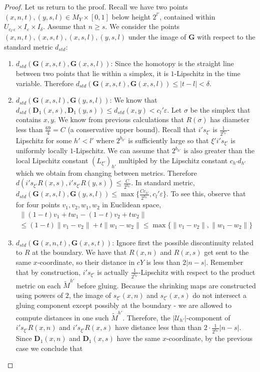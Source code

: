 \documentclass[a4paper,11pt]{article}
\theoremstyle{definition}
\theoremstyle{plain}
\theoremstyle{remark}
\begin{document}
{\begin{proof}
Let us return to the proof. Recall we have two points $(x,n,t),(y,s,l) \in M_{Y} \times [0,1]$ below height $2^{l'}$, contained within $U_{c_{l'}\varepsilon} \times I_{\varepsilon} \times I_{\delta}$. Assume that $n\geq s$. We consider the points $(x,n,t),(x,s,t),(x,s,l),(y,s,l)$ under the image of $\mathbf{G}$ with respect to the standard metric $d_{std}$:
\begin{enumerate}
\item $d_{std}(\mathbf{G}(x,s,t), \mathbf{G}(x,s,l))$: Since the homotopy is the straight line between two points that lie within a simplex, it is $1$-Lipschitz in the time variable. Therefore $d_{std}(\mathbf{G}(x,s,t), \mathbf{G}(x,s,l))\leq |t-l|<\delta$. 
\item $d_{std}(\mathbf{G}(x,s,l), \mathbf{G}(y,s,l))$: We know that $d_{std}(\mathbf{D}_{1}(x,s), \mathbf{D}_{1}(y,s))\leq d_{std}(x,y)< c_{l}'\varepsilon$. Let $\sigma$ be the simplex that contains $x,y$. We know from previous calculations that $R(\sigma)$ has diameter less than $\frac{69}{4} = C$ (a conservative upper bound). Recall that $i's_{\xi'}$ is $\frac{1}{2^{b_{h'}}}$-Lipschitz for some $h'<l'$ where $2^{b_{h'}}$ is sufficiently large so that $\xi' i's_{\xi'}$ is uniformly locally $1$-Lipschitz. We can assume that $2^{b_{h'}}$ is also greater than the local Lipschitz constant $(L_{\xi'})_{h'}$ multipled by the Lipschitz constant $c_{h'}d_{h'}$ which we obtain from changing between metrics. Therefore $d(i's_{\xi'}R(x,s), i's_{\xi'}R(y,s))\leq \frac{C}{2^{b_{h'}}}$. In standard metric, $d_{std}(\mathbf{G}(x,s,l), \mathbf{G}(y,s,l))\leq \max\{\frac{Cc_{h'}}{2^{b_{h'}}},c_{l}'\varepsilon\}$. To see this, observe that for four points $v_1,v_2,w_1,w_2$ in Euclidean space, 
\begin{align*}
\|(1-t)v_1+tw_1 - (1-t)v_2 + tw_2\| \\
\leq (1-t)\|v_1-v_2\| + t\|w_1-w_2\| \leq \max \{\|v_1-v_2\|, \|w_1-w_2\|\}
\end{align*}
\item $d_{std}(\mathbf{G}(x,n,t), \mathbf{G}(x,s,t))$:  Ignore first the possible discontinuity related to $R$ at the boundary. We have that $R(x,n)$ and $R(x,s)$ get sent to the same $x$-coordinate, so their distance in $cY$ is less than $2|n-s|$. Remember that by construction, $i' s_{\xi'}$ is actually $\frac{1}{2^{b_{h'}}}$-Lipschitz with respect to the product metric on each $\tilde{M}^{h'}$ before gluing.  Because the shrinking maps are constructed using powers of $2$, the image of $s_{\xi'}(x,n)$ and $s_{\xi'} (x,s)$ do not intersect a gluing component except possibly at the boundary - we are allowed to compute distances in one such $\tilde{M}^{h'}$. Therefore, the $|\mathcal{U}_{h'}|$-component of $i's_{\xi'}R(x,n)$ and $i's_{\xi'} R(x,s)$ have distance less than than $2\cdot \frac{1}{2^{b_{h'}}} |n-s|$. Since $\mathbf{D}_1(x,n)$ and $\mathbf{D}_{1}(x,s)$ have the same $x$-coordinate, by the previous case we conclude that 

\end{enumerate}
\end{proof}}
\end{document}

